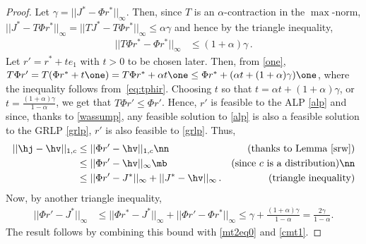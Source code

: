 \begin{proof}
Let $\gamma=||J^*-\Phi r^*||_\infty$. Then, since $T$ is an $\alpha$-contraction in the $\max$-norm,
$||J^*-T\Phi r^*||_\infty=||TJ^*-T\Phi r^*||_\infty\leq\alpha\gamma$ and hence by the triangle inequality,
\begin{align}\label{eq:tphir}
||T\Phi r^*-\Phi r^*||_\infty&\leq(1+\alpha)\gamma\,.
\end{align}
Let $r'= r^*+t e_1$ with $t>0$ to be chosen later.
Then, from \cref{one},
$T\Phi r' = T(\Phi r^* + t \one) = T \Phi r^* + \alpha t \one \le \Phi r^* + (\alpha t+ (1+\alpha) \gamma) \one$,
 where the inequality follows from~\eqref{eq:tphir}.
 Choosing $t$ so that $t = \alpha t+ (1+\alpha) \gamma$, or $t = \frac{(1+\alpha)\gamma}{1-\alpha}$, we get
 that $T\Phi r' \le \Phi r'$. Hence, $r'$ is feasible to the ALP \eqref{alp} and 
since, thanks to \cref{wassump}, 
any feasible solution to \eqref{alp} is also a feasible solution to the GRLP  \eqref{grlp},
$r'$ is also feasible to \eqref{grlp}. Thus, 
\begin{align}
||\hj-\hv||_{1,c}&\leq||\Phi r'-\hv||_{1,c}\nn &(\text{thanks to Lemma~\ref{srw}}) \\ %
&\leq||\Phi r'-\hv||_\infty\mb & (\text{since $c$ is a distribution})\nn\\
&\leq||\Phi r'-J^*||_\infty+||J^*-\hv||_\infty\,. & (\text{triangle inequality}) \label{mt2eq0}
\end{align}
Now, by another triangle inequality,
\begin{align}
||\Phi r'-J^*||_\infty&\leq ||\Phi r^* -J^*||_\infty+||\Phi r'-\Phi r^*||_\infty
\leq \gamma+\frac{(1+\alpha)\gamma}{1-\alpha}=\frac{2\gamma}{1-\alpha}.
\label{mt2eq1}
\end{align}
The result follows by combining this bound with \eqref{mt2eq0} and \cref{cmt1}.
\end{proof}

